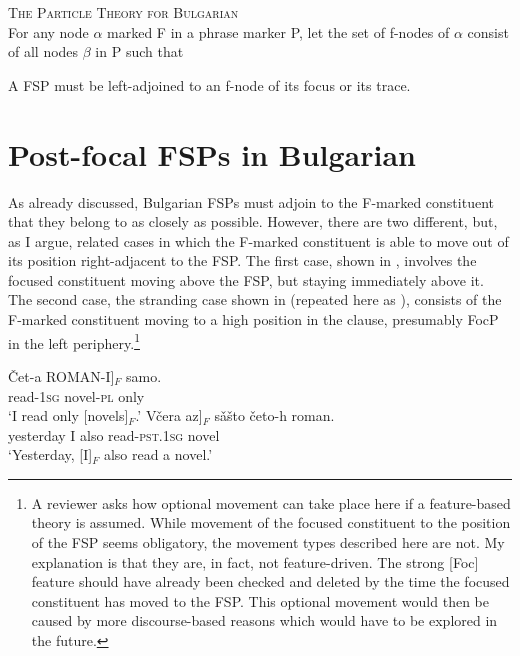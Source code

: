 \documentclass[output=paper,colorlinks,citecolor=brown]{langscibook}
\begin{document}
\ea\label{PTBulgarian1} 
\textsc{The Particle Theory for Bulgarian} \\
For any node $\alpha$ marked F in a phrase marker P, let the set of f-nodes of $\alpha$ consist of all nodes $\beta$ in P such that 
\label{spellref:PTBulgarian1b}
\label{spellref:PTBulgarian1c}
\z
\z 

\ea\label{PTBulgarian2} 
{A FSP must be left-adjoined to an f-node of its focus or its trace.}
\z

\section{Post-focal FSPs in Bulgarian}\label{sec:4}
As already discussed, Bulgarian FSPs must adjoin to the F-marked constituent that they belong to as closely as possible. However, there are two different, but, as I argue, related cases in which the F-marked constituent is able to move out of its position right-adjacent to the FSP. The first case, shown in , involves the focused constituent moving above the FSP, but staying immediately above it. The second case, the stranding case shown in  (repeated here as ), consists of the F-marked constituent moving to a high position in the clause, presumably FocP in the left periphery.\footnote{A reviewer asks how optional movement can take place here if a feature-based theory is assumed. While movement of the focused constituent to the position of the FSP seems obligatory, the movement types described here are not. My explanation is that they are, in fact, not feature-driven. The strong [Foc] feature should have already been checked and deleted by the time the focused constituent has moved to the FSP. This optional movement would then be  caused by more discourse-based reasons which would have to be explored in the future.} 

\ea\label{postfoc1}
\ea
\gll \v{C}et-a \minsp{[} ROMAN-I]$_{F}$ samo. \\
read-\textsc{1sg} {} novel-\textsc{pl} only \\
\glt `I read only [novels]$_{F}$.’
\ex
\gll V\v{c}era \minsp{[} az]$_{F}$ s\v{a}\v{s}to \v{c}eto-h roman. \\
yesterday {} I also read-\textsc{pst.1sg} novel \\
\glt `Yesterday, [I]$_{F}$ also read a novel.’
\z
\z
\end{document}
